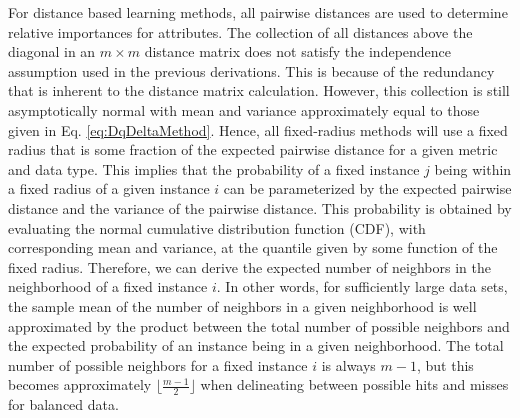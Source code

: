 \documentclass[10pt,letterpaper]{article}\usepackage[]{graphicx}\usepackage[]{color}
\begin{document}


For distance based learning methods, all pairwise distances are used to determine relative importances for attributes. The collection of all distances above the diagonal in an $m \times m$ distance matrix does not satisfy the independence assumption used in the previous derivations. This is because of the redundancy that is inherent to the distance matrix calculation. However, this collection is still asymptotically normal with mean and variance approximately equal to those given in Eq. \ref{eq:DqDeltaMethod}. Hence, all fixed-radius methods will use a fixed radius that is some fraction of the expected pairwise distance for a given metric and data type. This implies that the probability of a fixed instance $j$ being within a fixed radius of a given instance $i$ can be parameterized by the expected pairwise distance and the variance of the pairwise distance. This probability is obtained by evaluating the normal cumulative distribution function (CDF), with corresponding mean and variance, at the quantile given by some function of the fixed radius. Therefore, we can derive the expected number of neighbors in the neighborhood of a fixed instance $i$. In other words, for sufficiently large data sets, the sample mean of the number of neighbors in a given neighborhood is well approximated by the product between the total number of possible neighbors and the expected probability of an instance being in a given neighborhood. The total number of possible neighbors for a fixed instance $i$ is always $m-1$, but this becomes approximately $\lfloor{\frac{m - 1}{2}}\rfloor$ when delineating between possible hits and misses for balanced data.
\end{document}
